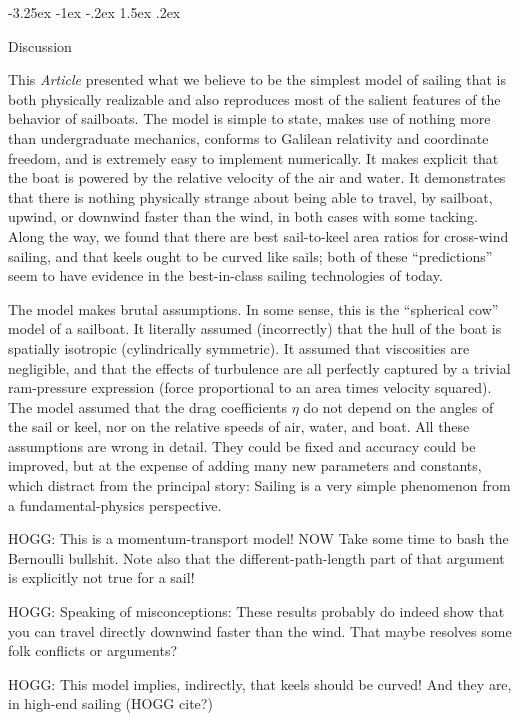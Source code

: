 \documentclass[letterpaper]{article}
\makeatletter
\newcommand{\documentname}{\textsl{Article}}
\renewcommand\section{\@startsection {section}{1}{\z@}%
  {-3.25ex \@plus -1ex \@minus -.2ex}%
  {1.5ex \@plus .2ex}%
  {\raggedright\normalfont\large\bfseries}}
\makeatother
\begin{document}
\section{Discussion}\label{sec:discussion}

This \documentname{} presented what we believe to be the simplest model of sailing that is both physically realizable and also reproduces most of the salient features of the behavior of sailboats.
The model is simple to state, makes use of nothing more than undergraduate mechanics, conforms to Galilean relativity and coordinate freedom, and is extremely easy to implement numerically.
It makes explicit that the boat is powered by the relative velocity of the air and water.
It demonstrates that there is nothing physically strange about being able to travel, by sailboat, upwind, or downwind faster than the wind, in both cases with some tacking.
Along the way, we found that there are best sail-to-keel area ratios for cross-wind sailing, and that keels ought to be curved like sails; both of these ``predictions'' seem to have evidence in the best-in-class sailing technologies of today.

The model makes brutal assumptions.
In some sense, this is the ``spherical cow'' model of a sailboat.
It literally assumed (incorrectly) that the hull of the boat is spatially isotropic (cylindrically symmetric).
It assumed that viscosities are negligible, and that the effects of turbulence are all perfectly captured by a trivial ram-pressure expression (force proportional to an area times velocity squared).
The model assumed that the drag coefficients $\eta$ do not depend on the angles of the sail or keel, nor on the relative speeds of air, water, and boat.
All these assumptions are wrong in detail.
They could be fixed and accuracy could be improved, but at the expense of adding many new parameters and constants, which distract from the principal story:
Sailing is a very simple phenomenon from a fundamental-physics perspective.

HOGG: This is a momentum-transport model! NOW Take some time to bash the Bernoulli bullshit. Note also that the different-path-length part of that argument is explicitly not true for a sail!

HOGG: Speaking of misconceptions: These results probably do indeed show that you can travel directly downwind faster than the wind. That maybe resolves some folk conflicts or arguments?

HOGG: This model implies, indirectly, that keels should be curved! And they are, in high-end sailing (HOGG cite?)
\end{document}
